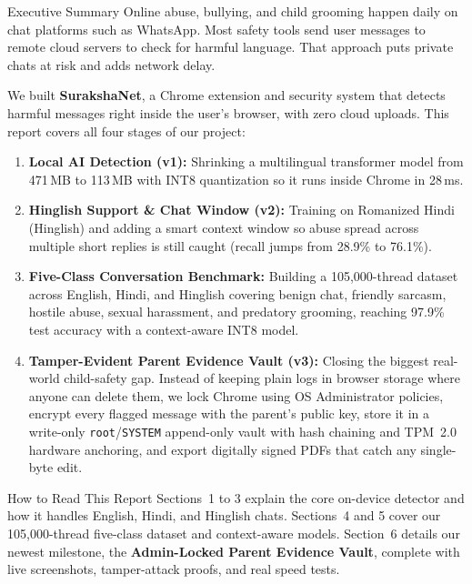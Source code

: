 \documentclass[11pt,a4paper]{article}
\begin{document}
\begin{summarybox}{Executive Summary}
\small
Online abuse, bullying, and child grooming happen daily on chat platforms such as WhatsApp. Most safety tools send user messages to remote cloud servers to check for harmful language. That approach puts private chats at risk and adds network delay.

We built \textbf{SurakshaNet}, a Chrome extension and security system that detects harmful messages right inside the user's browser, with zero cloud uploads. This report covers all four stages of our project:
\begin{enumerate}[itemsep=2pt, topsep=3pt]
  \item \textbf{Local AI Detection (v1):} Shrinking a multilingual transformer model from 471\,MB to 113\,MB with INT8 quantization so it runs inside Chrome in 28\,ms.
  \item \textbf{Hinglish Support \& Chat Window (v2):} Training on Romanized Hindi (Hinglish) and adding a smart context window so abuse spread across multiple short replies is still caught (recall jumps from 28.9\% to 76.1\%).
  \item \textbf{Five-Class Conversation Benchmark:} Building a 105{,}000-thread dataset across English, Hindi, and Hinglish covering benign chat, friendly sarcasm, hostile abuse, sexual harassment, and predatory grooming, reaching 97.9\% test accuracy with a context-aware INT8 model.
  \item \textbf{Tamper-Evident Parent Evidence Vault (v3):} Closing the biggest real-world child-safety gap. Instead of keeping plain logs in browser storage where anyone can delete them, we lock Chrome using OS Administrator policies, encrypt every flagged message with the parent's public key, store it in a write-only \texttt{root}/\texttt{SYSTEM} append-only vault with hash chaining and TPM~2.0 hardware anchoring, and export digitally signed PDFs that catch any single-byte edit.
\end{enumerate}
\end{summarybox}

\newpage

\tableofcontents
\vspace{0.6cm}
\begin{takeawaybox}{How to Read This Report}
Sections~1 to 3 explain the core on-device detector and how it handles English, Hindi, and Hinglish chats. Sections~4 and 5 cover our 105{,}000-thread five-class dataset and context-aware models. Section~6 details our newest milestone, the \textbf{Admin-Locked Parent Evidence Vault}, complete with live screenshots, tamper-attack proofs, and real speed tests.
\end{takeawaybox}
\end{document}
